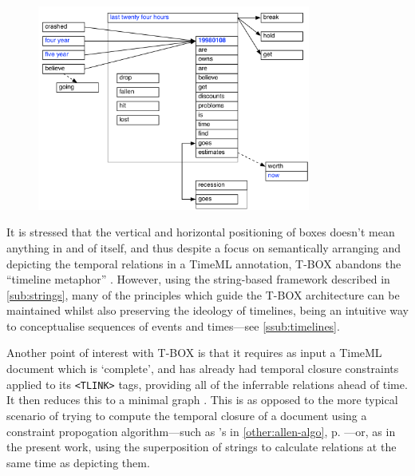 \documentclass[a4paper,12pt,leqno,twoside]{article}
\begin{document}
\begin{center}
	\begin{figure}[h!]
		\centering
		\includegraphics[width=0.8\textwidth]{images/tbox}
		\label{fig:tbox}
	\end{figure}
\end{center}
It is stressed that the vertical and horizontal positioning of boxes doesn't mean anything in and of itself, and thus despite a focus on semantically arranging and depicting the temporal relations in a TimeML annotation, T-BOX abandons the ``timeline metaphor'' \citep{verhagen2005TBOX}. However, using the string-based framework described in \cref{sub:strings}, many of the principles which guide the T-BOX architecture can be maintained whilst also preserving the ideology of timelines, being an intuitive way to conceptualise sequences of events and times---see \cref{ssub:timelines}.

Another point of interest with T-BOX is that it requires as input a TimeML document which is `complete', and has already had temporal closure constraints applied to its \verb|<TLINK>| tags, providing all of the inferrable relations ahead of time. It then reduces this to a minimal graph \citep[p. 6]{verhagen2005TBOX}. This is as opposed to the more typical scenario of trying to compute the temporal closure of a document using a constraint propogation algorithm---such as \citet{allen1983maintaining}'s in \cref{other:allen-algo}, p. \pageref{other:allen-algo}---or, as in the present work, using the superposition of strings to calculate relations at the same time as depicting them.
\end{document}
